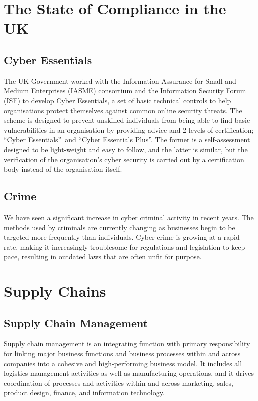 \section{The State of Compliance in the UK}

    \subsection{Cyber Essentials}
        The UK Government worked with the Information Assurance for Small and Medium Enterprises (IASME) consortium and the Information Security Forum (ISF) to develop Cyber Essentials, a set of basic technical controls to help organisations protect themselves against common online security threats. \cite{CyberEssentials} The scheme is designed to prevent unskilled individuals from being able to find basic vulnerabilities in an organisation by providing advice and 2 levels of certification; \textquotedblleft Cyber Essentials\textquotedblright\ and \textquotedblleft Cyber Essentials Plus\textquotedblright. The former is a self-assessment designed to be light-weight and easy to follow, and the latter is similar, but the verification of the organisation\textquoteright s cyber security is carried out by a certification body instead of the organisation itself.

    \subsection{Crime}
        We have seen a significant increase in cyber criminal activity in recent years. The methods used by criminals are currently changing as businesses begin to be targeted more frequently than individuals. Cyber crime is growing at a rapid rate, making it increasingly troublesome for regulations and legislation to keep pace, resulting in outdated laws that are often unfit for purpose. \cite{GDPR}

\section{Supply Chains}

    \subsection{Supply Chain Management}
        Supply chain management is an integrating function with primary responsibility for linking major business functions and business processes within and across companies into a cohesive and high-performing business model. It includes all logistics management activities as well as manufacturing operations, and it drives coordination of processes and activities within and across marketing, sales, product design, finance, and information technology. \cite{CSCRM}

